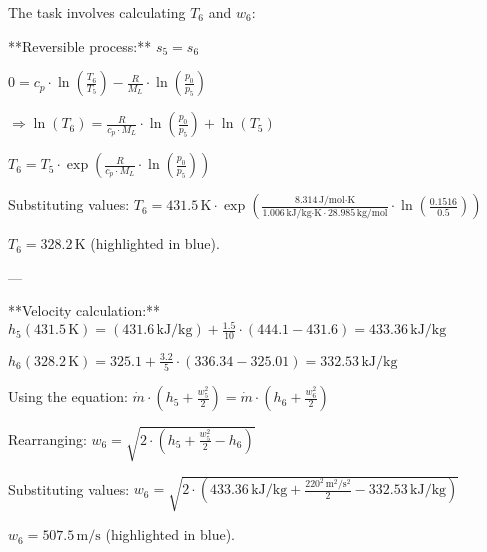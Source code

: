 The task involves calculating \( T_6 \) and \( w_6 \):  

**Reversible process:**  
\( s_5 = s_6 \)  

\( 0 = c_p \cdot \ln \left( \frac{T_6}{T_5} \right) - \frac{R}{M_L} \cdot \ln \left( \frac{p_0}{p_5} \right) \)  

\( \Rightarrow \ln (T_6) = \frac{R}{c_p \cdot M_L} \cdot \ln \left( \frac{p_0}{p_5} \right) + \ln (T_5) \)  

\( T_6 = T_5 \cdot \exp \left( \frac{R}{c_p \cdot M_L} \cdot \ln \left( \frac{p_0}{p_5} \right) \right) \)  

Substituting values:  
\( T_6 = 431.5 \, \text{K} \cdot \exp \left( \frac{8.314 \, \text{J/mol·K}}{1.006 \, \text{kJ/kg·K} \cdot 28.985 \, \text{kg/mol}} \cdot \ln \left( \frac{0.1516}{0.5} \right) \right) \)  

\( T_6 = 328.2 \, \text{K} \) (highlighted in blue).  

---

**Velocity calculation:**  
\( h_5 (431.5 \, \text{K}) = (431.6 \, \text{kJ/kg}) + \frac{1.5}{10} \cdot (444.1 - 431.6) = 433.36 \, \text{kJ/kg} \)  

\( h_6 (328.2 \, \text{K}) = 325.1 + \frac{3.2}{5} \cdot (336.34 - 325.01) = 332.53 \, \text{kJ/kg} \)  

Using the equation:  
\( \dot{m} \cdot \left( h_5 + \frac{w_5^2}{2} \right) = \dot{m} \cdot \left( h_6 + \frac{w_6^2}{2} \right) \)  

Rearranging:  
\( w_6 = \sqrt{2 \cdot \left( h_5 + \frac{w_5^2}{2} - h_6 \right)} \)  

Substituting values:  
\( w_6 = \sqrt{2 \cdot \left( 433.36 \, \text{kJ/kg} + \frac{220^2 \, \text{m}^2/\text{s}^2}{2} - 332.53 \, \text{kJ/kg} \right)} \)  

\( w_6 = 507.5 \, \text{m/s} \) (highlighted in blue).